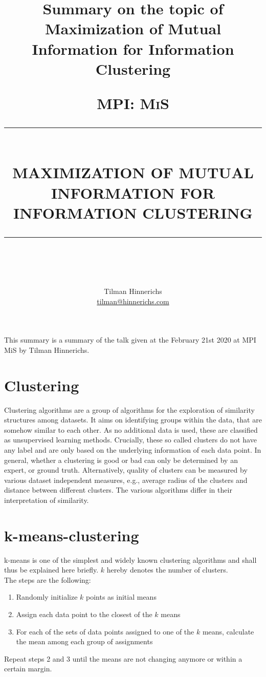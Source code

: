 \documentclass[]{article}
\title{Summary on the topic of Maximization of Mutual Information for Information Clustering}
\author{Tilman Hinnerichs\\
\href{mailto:tilman@hinnerichs.com}{tilman@hinnerichs.com}}
\date{}
\newcommand{\HRule}[1]{\rule{\linewidth}{#1}}
\begin{document}
	
	\title{ \normalsize \textsc{MPI: MiS}
		\\ [0.5cm]
		\HRule{0.5pt} \\
		\LARGE \textbf{\uppercase{Maximization of Mutual Information for Information Clustering}}
		\HRule{0.5pt} \\ [0.5cm]
		\normalsize }

\maketitle

This summary is a summary of the talk given at the February 21st 2020 at MPI MiS by Tilman Hinnerichs.
\section{Clustering}
Clustering algorithms are a group of algorithms for the exploration of similarity structures among datasets. It aims on identifying groups within the data, that are somehow similar to each other. As no additional data is used, these are classified as unsupervised learning methods. Crucially, these so called clusters do not have any label and are only based on the underlying information of each data point. In general, whether a clustering is good or bad can only be determined by an expert, or ground truth. Alternatively, quality of clusters can be measured by various dataset independent measures, e.g., average radius of the clusters and distance between different clusters. The various algorithms differ in their interpretation of similarity. \\
\section{k-means-clustering}
k-means is one of the simplest and widely known clustering algorithms and shall thus be explained here briefly. $k$ hereby denotes the number of clusters.\\
The steps are the following:
\begin{enumerate}
	\item Randomly initialize $k$ points as initial means 
	\item Assign each data point to the closest of the $k$ means
	\item For each of the sets of data points assigned to one of the $k$ means, calculate the mean among each group of assignments
\end{enumerate}
Repeat steps 2 and 3 until the means are not changing anymore or within a certain margin.
\end{document}
